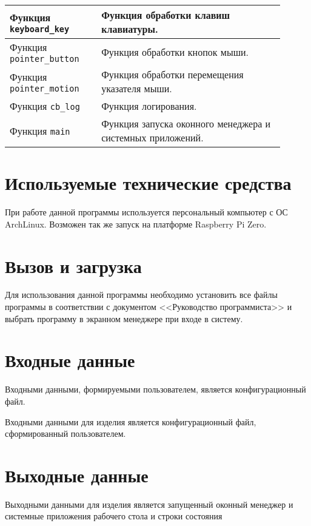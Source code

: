 \documentclass[10pt,a4paper]{report}
\begin{document}
\begin{table}[H]
\begin{center}
\begin{tabular}{| p{0.3\linewidth} | p{0.6\linewidth} |}
\hline
Функция \texttt{keyboard\_key} & Функция обработки клавиш клавиатуры.\\
\hline
Функция \texttt{pointer\_button} & Функция обработки кнопок мыши.\\
\hline
Функция \texttt{pointer\_motion} & Функция обработки перемещения указателя мыши.\\
\hline
Функция \texttt{cb\_log} & Функция логирования.\\
\hline
Функция \texttt{main} & Функция запуска оконного менеджера и системных приложений.\\
\hline
\end{tabular}
\end{center}
\end{table}
		
\section{Используемые технические средства}
При работе данной программы используется персональный компьютер с ОС ArchLinux. Возможен так же запуск на платформе Raspberry Pi Zero.
	
\section{Вызов и загрузка}
Для использования данной программы необходимо установить все файлы программы в соответствии с документом <<Руководство программиста>> и выбрать программу в экранном менеджере при входе в систему.
	
\section{Входные данные}
Входными данными, формируемыми пользователем, является конфигурационный файл.
		
Входными данными для изделия является конфигурационный файл, сформированный пользователем.
		
\section{Выходные данные}
Выходными данными для изделия является запущенный оконный менеджер и системные приложения рабочего стола и строки состояния
\end{document}
